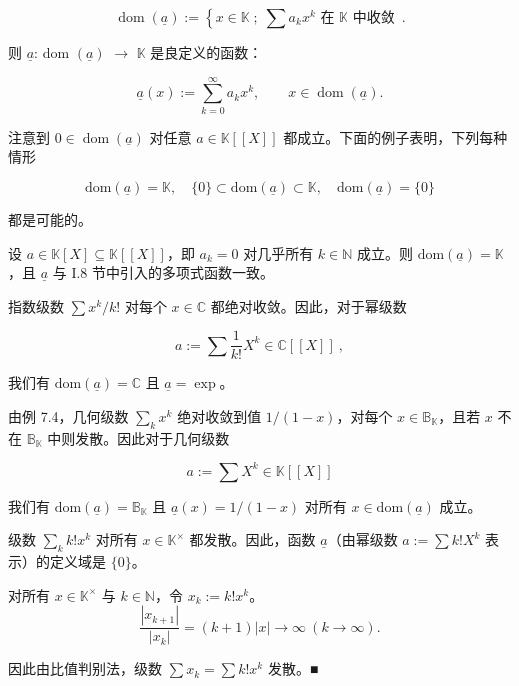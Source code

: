 \[
\operatorname{dom}(\underline{a}):=\left\{x\in\mathbb{K}\;;\;\sum a_{k} x^{k}\right. \text{ 在 }\mathbb{K}\text{ 中收敛}\enspace.
\]

则  $ \underline{a} $: dom $ (\underline{a}) $  $ \rightarrow $  $ \mathbb{K} $ 是良定义的函数：

\begin{equation}
\underline{a}(x):=\sum_{k=0}^{\infty}a_{k}x^{k},\qquad x\in\operatorname{dom}(\underline{a}).
\end{equation}

注意到  $ 0 \in \operatorname{dom}(\underline{a}) $ 对任意  $ a \in \mathbb{K}[\![X]\!] $ 都成立。下面的例子表明，下列每种情形

\[
\mathrm{dom}(\underline{a})=\mathbb{K},\quad\{0\}\subset\mathrm{dom}(\underline{a})\subset\mathbb{K},\quad\mathrm{dom}(\underline{a})=\{0\}
\]

都是可能的。

\begin{example}

\begin{items}
\item

设  $ a \in \mathbb{K}[X] \subseteq \mathbb{K}[\![X]\!] $，即  $ a_k = 0 $ 对几乎所有  $ k \in \mathbb{N} $ 成立。则  $ \text{dom}(\underline{a}) = \mathbb{K} $，且  $ \underline{a} $ 与 I.8 节中引入的多项式函数一致。

\item

指数级数  $ \sum x^k / k! $ 对每个  $ x \in \mathbb{C} $ 都绝对收敛。因此，对于幂级数

\[
a:=\sum\frac{1}{k!}X^{k}\in\mathbb{C}[\![X]\!]~,
\]

我们有  $ \mathrm{dom}(\underline{a}) = \mathbb{C} $ 且  $ \underline{a} = \exp $。

\item

由例 7.4，几何级数  $ \sum_k x^k $ 绝对收敛到值  $ 1/(1-x) $，对每个  $ x \in \mathbb{B}_{\mathbb{K}} $，且若  $ x $ 不在  $ \mathbb{B}_{\mathbb{K}} $ 中则发散。因此对于几何级数

\[
a:=\sum X^{k}\in\mathbb{K}[\![X]\!]
\]

我们有  $ \mathrm{dom}(\underline{a}) = \mathbb{B}_{\mathbb{K}} $ 且  $ \underline{a}(x) = 1/(1 - x) $ 对所有  $ x \in \mathrm{dom}(\underline{a}) $ 成立。

\item

级数  $ \sum_k k! x^k $ 对所有  $ x \in \mathbb{K}^\times $ 都发散。因此，函数  $ \underline{a} $（由幂级数  $ a := \sum k! X^k $ 表示）的定义域是  $ \{0\} $。

\proofhead
对所有  $ x \in \mathbb{K}^\times $ 与  $ k \in \mathbb{N} $，令  $ x_k := k! x^k $。
\[
\frac{\left|x_{k+1}\right|}{\left|x_{k}\right|}=\left(k+1\right)\left|x\right|\rightarrow\infty\ \left(k\rightarrow\infty\right).
\]

因此由比值判别法，级数  $ \sum x_k = \sum k! x^k $ 发散。■

\end{items}

\end{example}

